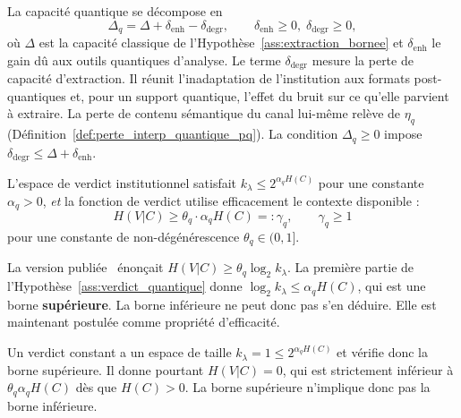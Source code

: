 \begin{sloppypar}
\begin{definition}\label{def:decomposition_delta_q}
La capacit\'e quantique se d\'ecompose en
\begin{equation}
\Delta_q = \Delta + \delta_{\mathrm{enh}} - \delta_{\mathrm{degr}}, \qquad
\delta_{\mathrm{enh}} \geq 0,\; \delta_{\mathrm{degr}} \geq 0,
\label{eq:decomposition_delta_q_pq}
\end{equation}
o\`u $\Delta$ est la capacit\'e classique de l'Hypoth\`ese~\ref{ass:extraction_bornee}
et $\delta_{\mathrm{enh}}$ le gain d\^u aux outils quantiques d'analyse. Le terme
$\delta_{\mathrm{degr}}$ mesure la perte de capacit\'e d'extraction. Il r\'eunit
l'inadaptation de l'institution aux formats post-quantiques et, pour un support
quantique, l'effet du bruit sur ce qu'elle parvient \`a extraire. La perte de contenu
s\'emantique du canal lui-m\^eme rel\`eve de $\eta_q$
(D\'efinition~\ref{def:perte_interp_quantique_pq}). La condition $\Delta_q \geq 0$
impose $\delta_{\mathrm{degr}} \leq \Delta + \delta_{\mathrm{enh}}$.
\end{definition}

\begin{assumption}
\label{ass:verdict_quantique}
L'espace de verdict institutionnel satisfait $k_\lambda \leq
2^{\alpha_q H(C)}$ pour une constante $\alpha_q > 0$, \emph{et} la
fonction de verdict utilise efficacement le contexte disponible :
\begin{equation}
H(V|C) \geq \theta_q \cdot \alpha_q H(C) =: \gamma_q, \qquad \gamma_q \geq 1
\label{eq:verdict_quantique}
\end{equation}
pour une constante de non-d\'eg\'en\'erescence $\theta_q \in (0, 1]$.
\end{assumption}

\begin{remark}
\label{rem:statut_verdict_quantique}
La version publi\'ee~\cite{MINKA2026PQCRO} \'enon\c{c}ait $H(V|C) \geq \theta_q \log_2
k_\lambda$. La premi\`ere partie de l'Hypoth\`ese~\ref{ass:verdict_quantique} donne
$\log_2 k_\lambda \leq \alpha_q H(C)$, qui est une borne \textbf{sup\'erieure}.
La borne inf\'erieure ne peut donc pas s'en d\'eduire. Elle est maintenant
postul\'ee comme propri\'et\'e d'efficacit\'e.
\end{remark}

\begin{Preuve}
Un verdict constant a un espace de taille $k_\lambda = 1 \leq 2^{\alpha_q H(C)}$
et v\'erifie donc la borne sup\'erieure. Il donne pourtant $H(V|C) = 0$, qui est
strictement inf\'erieur \`a $\theta_q\alpha_q H(C)$ d\`es que $H(C) > 0$. La borne
sup\'erieure n'implique donc pas la borne inf\'erieure.
\end{Preuve}


\end{sloppypar}
